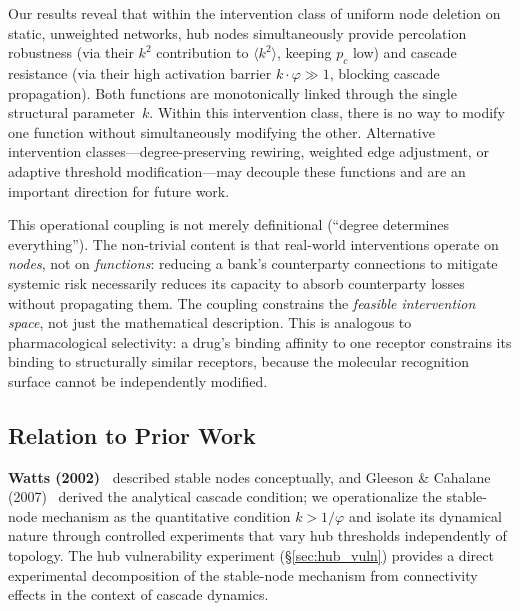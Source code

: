 \documentclass[aps,pre,twocolumn,superscriptaddress,showpacs]{revtex4-2}
\newcommand{\avg}[1]{\langle #1 \rangle}
\newcommand{\pc}{p_c}
\begin{document}
Our results reveal that within the intervention class of uniform node deletion on static, unweighted networks, hub nodes simultaneously provide percolation robustness (via their $k^2$ contribution to $\avg{k^2}$, keeping $\pc$ low) and cascade resistance (via their high activation barrier $k \cdot \varphi \gg 1$, blocking cascade propagation). Both functions are monotonically linked through the single structural parameter~$k$. Within this intervention class, there is no way to modify one function without simultaneously modifying the other. Alternative intervention classes---degree-preserving rewiring, weighted edge adjustment, or adaptive threshold modification---may decouple these functions and are an important direction for future work.

This operational coupling is not merely definitional (``degree determines everything''). The non-trivial content is that real-world interventions operate on \emph{nodes}, not on \emph{functions}: reducing a bank's counterparty connections to mitigate systemic risk necessarily reduces its capacity to absorb counterparty losses without propagating them. The coupling constrains the \emph{feasible intervention space}, not just the mathematical description. This is analogous to pharmacological selectivity: a drug's binding affinity to one receptor constrains its binding to structurally similar receptors, because the molecular recognition surface cannot be independently modified.

\subsection{Relation to Prior Work}

\textbf{Watts (2002)~\cite{Watts2002}} described stable nodes conceptually, and Gleeson \& Cahalane (2007)~\cite{Gleeson2007} derived the analytical cascade condition; we operationalize the stable-node mechanism as the quantitative condition $k > 1/\varphi$ and isolate its dynamical nature through controlled experiments that vary hub thresholds independently of topology. The hub vulnerability experiment (\S\ref{sec:hub_vuln}) provides a direct experimental decomposition of the stable-node mechanism from connectivity effects in the context of cascade dynamics.
\end{document}
